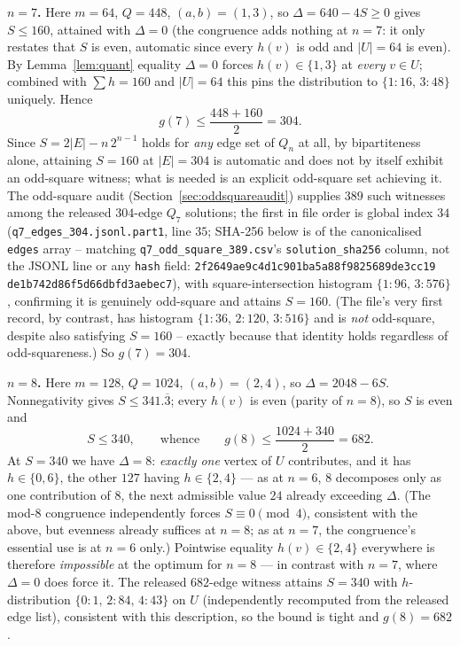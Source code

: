 \documentclass[12pt,a4paper]{article}
\theoremstyle{definition}
\begin{document}
\textbf{$n=7$.} Here $m=64$, $Q=448$, $(a,b)=(1,3)$, so
$\Delta=640-4S\ge0$ gives $S\le160$, attained with $\Delta=0$ (the
congruence adds nothing at $n=7$: it only restates that $S$ is even,
automatic since every $h(v)$ is odd and $|U|=64$ is even). By
Lemma~\ref{lem:quant} equality $\Delta=0$ forces $h(v)\in\{1,3\}$ at
\emph{every} $v\in U$; combined with $\sum h=160$ and $|U|=64$ this
pins the distribution to $\{1{:}16,\,3{:}48\}$ uniquely. Hence
\[
g(7)\le\frac{448+160}{2}=304 .
\]
Since $S=2|E|-n\,2^{n-1}$ holds for \emph{any} edge set of $Q_n$ at all,
by bipartiteness alone, attaining $S=160$ at $|E|=304$ is automatic
and does not by itself exhibit an odd-square witness; what is needed is
an explicit odd-square set achieving it. The odd-square audit
(Section~\ref{sec:oddsquareaudit}) supplies $389$ such witnesses among
the released $304$-edge $Q_7$ solutions; the first in file order is
global index $34$ (\texttt{q7\_edges\_304.jsonl.part1}, line $35$; SHA-256
below is of the canonicalised \texttt{edges} array -- matching
\texttt{q7\_odd\_square\_389.csv}'s \texttt{solution\_sha256} column,
not the JSONL line or any \texttt{hash} field:
\texttt{2f2649ae9c4d1c901ba5a88f9825689de3cc19\allowbreak
de1b742d86f5d66dbfd3aebec7}), with square-intersection histogram $\{1{:}96,\,3{:}576\}$,
confirming it is genuinely odd-square and attains $S=160$. (The file's
very first record, by contrast, has histogram
$\{1{:}36,\,2{:}120,\,3{:}516\}$ and is \emph{not} odd-square, despite
also satisfying $S=160$ -- exactly because that identity holds
regardless of odd-squareness.) So $g(7)=304$.

\textbf{$n=8$.} Here $m=128$, $Q=1024$, $(a,b)=(2,4)$, so
$\Delta=2048-6S$. Nonnegativity gives $S\le341.\overline{3}$; every
$h(v)$ is even (parity of $n=8$), so $S$ is even and
\[
S\le340,
\qquad\text{whence}\qquad
g(8)\le\frac{1024+340}{2}=682 .
\]
At $S=340$ we have $\Delta=8$: \emph{exactly one} vertex of $U$
contributes, and it has $h\in\{0,6\}$, the other $127$ having
$h\in\{2,4\}$ --- as at $n=6$, $8$ decomposes only as one contribution
of $8$, the next admissible value $24$ already exceeding $\Delta$. (The
mod-$8$ congruence independently forces
$S\equiv0\pmod4$, consistent with the above, but evenness already
suffices at $n=8$; as at $n=7$, the congruence's essential use is at
$n=6$ only.) Pointwise equality $h(v)\in\{2,4\}$ everywhere is
therefore \emph{impossible} at the optimum for $n=8$ --- in contrast
with $n=7$, where $\Delta=0$ does force it. The released $682$-edge
witness attains $S=340$ with $h$-distribution
$\{0{:}1,\,2{:}84,\,4{:}43\}$ on $U$ (independently recomputed from the
released edge list), consistent with this description, so the bound is
tight and $g(8)=682$.
\end{document}

